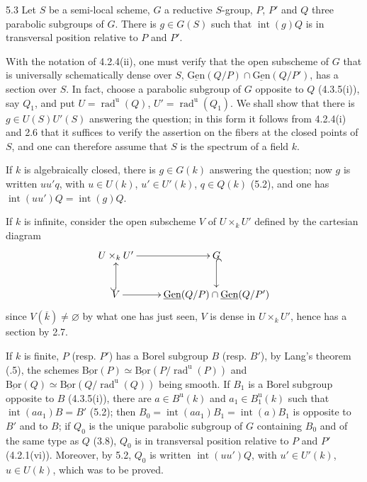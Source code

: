 \begin{corollary}{5.3}\label{XXVI.5.3}
Let $S$ be a semi-local scheme, $G$ a reductive $S$-group, $P$, $P'$ and $Q$ three parabolic subgroups of $G$. There is $g\in G(S)$ such that $\operatorname{int}(g)Q$ is in transversal position relative to $P$ and $P'$.
\end{corollary}
With the notation of 4.2.4(ii), one must verify that the open subscheme of $G$ that is universally schematically dense over $S$, $\underline{\mathrm{Gen}}(Q/P)\cap\underline{\mathrm{Gen}}(Q/P')$, has a section over $S$. In fact, choose a parabolic subgroup of $G$ opposite to $Q$ (4.3.5(i)), say $Q_1$, and put $U=\operatorname{rad}^{\mathrm u}(Q)$, $U'=\operatorname{rad}^{\mathrm u}(Q_1)$. We shall show that there is $g\in U(S)U'(S)$ answering the question; in this form it follows from 4.2.4(i) and 2.6 that it suffices to verify the assertion on the fibers at the closed points of $S$, and one can therefore assume that $S$ is the spectrum of a field $k$.

If $k$ is algebraically closed, there is $g\in G(k)$ answering the question; now $g$ is written $uu'q$, with $u\in U(k)$, $u'\in U'(k)$, $q\in Q(k)$ (5.2), and one has $\operatorname{int}(uu')Q=\operatorname{int}(g)Q$.

If $k$ is infinite, consider the open subscheme $V$ of $U\times_k U'$ defined by the cartesian diagram
\[
\xymatrix{
 U\times_k U'\ar[r]&G\\
 V\ar@{^{(}->}[u]\ar[r]&\underline{\mathrm{Gen}}(Q/P)\cap\underline{\mathrm{Gen}}(Q/P')\ar@{^{(}->}[u];
}
\]
since $V(\overline k)\neq\varnothing$ by what one has just seen, $V$ is dense in $U\times_k U'$, hence has a section by 2.7.

If $k$ is finite, $P$ (resp. $P'$) has a Borel subgroup $B$ (resp. $B'$), by Lang's theorem (.5), the schemes $\underline{\mathrm{Bor}}(P)\simeq\underline{\mathrm{Bor}}(P/\operatorname{rad}^{\mathrm u}(P))$ and $\underline{\mathrm{Bor}}(Q)\simeq\underline{\mathrm{Bor}}(Q/\operatorname{rad}^{\mathrm u}(Q))$ being smooth. If $B_1$ is a Borel subgroup opposite to $B$ (4.3.5(i)), there are $a\in B^{\mathrm u}(k)$ and $a_1\in B^{\mathrm u}_1(k)$ such that $\operatorname{int}(aa_1)B=B'$ (5.2); then $B_0=\operatorname{int}(aa_1)B_1=\operatorname{int}(a)B_1$ is opposite to $B'$ and to $B$; if $Q_0$ is the unique parabolic subgroup of $G$ containing $B_0$ and of the same type as $Q$ (3.8), $Q_0$ is in transversal position relative to $P$ and $P'$ (4.2.1(vi)). Moreover, by 5.2, $Q_0$ is written $\operatorname{int}(uu')Q$, with $u'\in U'(k)$, $u\in U(k)$, which was to be proved.

